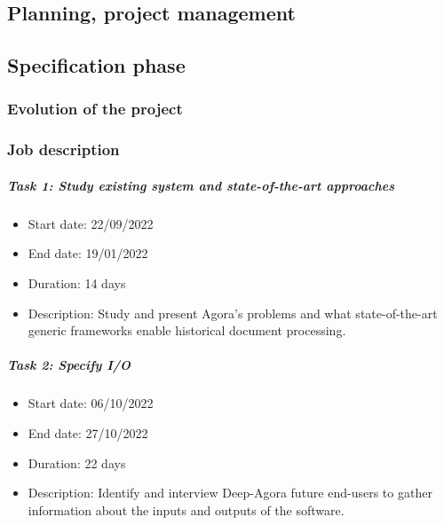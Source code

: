 \documentclass{polytech/polytech}
\numberwithin{figure}{chapter}
\begin{document}
\begin{appendix}



\chapter{Planning, project management}

\section{Specification phase}

\subsection{Evolution of the project}

\label{planSpecs}

\subsection{Job description}

\paragraph{Task 1: Study existing system and state-of-the-art approaches}
\begin{itemize}
    \item Start date: 22/09/2022
    \item End date: 19/01/2022
    \item Duration: 14 days
    \item
        Description: Study and present Agora's problems and what state-of-the-art generic frameworks enable historical document processing.
\end{itemize}

\paragraph{Task 2: Specify I/O}
\begin{itemize}
    \item Start date: 06/10/2022
    \item End date: 27/10/2022
    \item Duration: 22 days
    \item
        Description: Identify and interview Deep-Agora future end-users to gather information about the inputs and outputs of the software.
\end{itemize}


\end{appendix}
\end{document}

